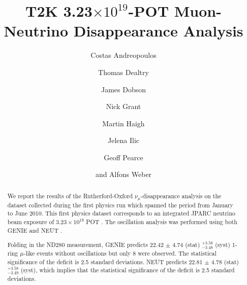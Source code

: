 %
%

\begin{frontmatter}

\title{
  T2K 3.23$\times10^{19}$-POT Muon-Neutrino Disappearance Analysis
}

\vspace*{0.7cm}

\author[RAL]     {Costas Andreopoulos}
\author[RAL,OXF] {Thomas Dealtry}
\author[ICL,RAL] {James Dobson}
\author[RAL]     {Nick Grant}
\author[OXF]     {Martin Haigh}
\author[RAL]     {Jelena Ilic}
\author[RAL]     {Geoff Pearce}
\author[RAL,OXF] {and Alfons Weber}


\address[RAL]{Particle Physics Dept., Rutherford Appleton Laboratory, STFC \\
              Harwell Science and Innovation Campus\\
              Oxfordshire OX11 0QX, UK}
\address[OXF]{Subdepartment of Particle Physics, University of Oxford \\
              Denys Wilkinson Building, Keble Road\\
              Oxfordshire OX1 3RH, UK}
\address[ICL]{Physics Dept., Imperial College London \\
              Blackett Lab, Prince Consort Road\\
              London SW7 2BW, UK}

%
%

\begin{abstract}

We report the results of the Rutherford-Oxford $\nu_{\mu}$-disappearance analysis
on the dataset collected during the first physics run which spanned the period 
from January to June 2010.
This first physics dataset corresponds to an integrated JPARC neutrino beam 
exposure of $3.23 \times 10^{19}$ POT \cite{SuperKAnalysisInputs}.
The oscillation analysis was performed using both GENIE \cite{Genie:NIM} and NEUT \cite{Neut:ActaP}.

Folding in the ND280 measurement, GENIE predicts 22.42 $\pm$ 4.74 (stat) $^{+3.58}_{-3.48}$ (syst)
1-ring $\mu$-like events without oscillations but only 8 were observed.
The statistical significance of the deficit is 2.5 standard deviations.
NEUT predicts 22.81 $\pm$ 4.78 (stat) $^{+3.58}_{-3.49}$ (syst), 
which implies that the statistical significance
of the deficit is 2.5 standard deviations. 


\end{abstract}
\end{frontmatter}
